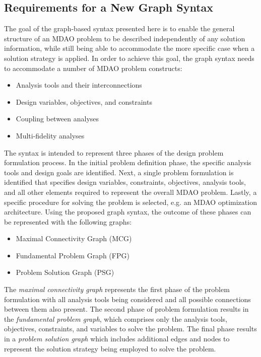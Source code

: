 \subsection{Requirements for a New Graph Syntax}
  \label{s:requirements}
  The goal of the graph-based syntax presented here is to enable the general
  structure of an MDAO problem to be described independently of any solution information,
  while still being able to accommodate the more specific case when a solution
  strategy is applied. In order to achieve this goal,
  the graph syntax needs to accommodate a number of MDAO problem constructs:
  \begin{itemize}
    \item Analysis tools and their interconnections
    \item Design variables, objectives, and constraints
    \item Coupling between analyses
    \item Multi-fidelity analyses
  \end{itemize}

  The syntax is intended to represent three phases of the design problem
  formulation process. In the initial problem definition phase, the specific
  analysis tools and design goals are identified. Next, a single problem
  formulation is identified that specifies design variables, constraints,
  objectives, analysis tools, and all other elements required to represent
  the overall MDAO problem. Lastly, a specific procedure for solving the problem
  is selected, e.g. an MDAO optimization architecture. Using
  the proposed graph syntax, the outcome of these phases can be represented with the following graphs:
  \begin{itemize}
    \item Maximal Connectivity Graph (MCG)
    \item Fundamental Problem Graph (FPG)
    \item Problem Solution Graph (PSG)
  \end{itemize}

  The \emph{maximal connectivity graph} represents the first phase of the problem
  formulation with all analysis tools being considered and all possible connections
  between them also present. The second phase of problem formulation results in the \emph{fundamental problem graph},
  which comprises only the analysis tools, objectives, constraints, and variables to solve the problem.
  The final phase results in a \emph{problem solution graph} which includes additional
  edges and nodes to represent the solution strategy being employed to solve the
  problem.

